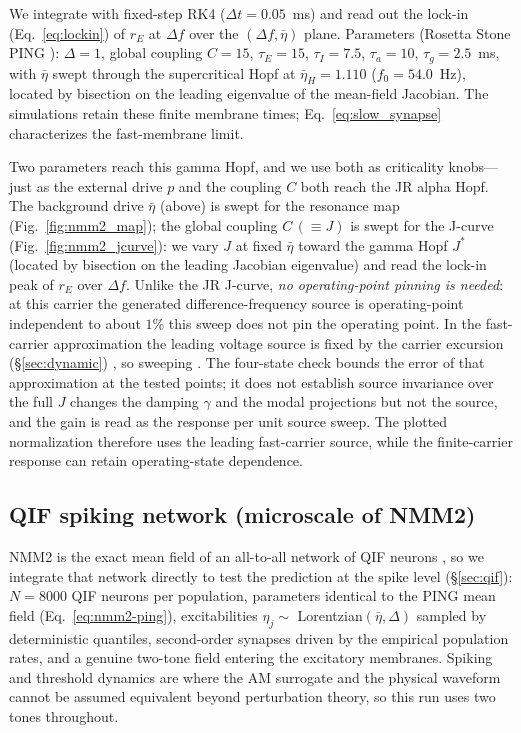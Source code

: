\documentclass[11pt,a4paper]{article}
\providecommand{\DIFaddtex}[1]{{\protect\color{blue} \sf #1}} %
\providecommand{\DIFdeltex}[1]{{\protect\color{red} \scriptsize #1}} %
\providecommand{\DIFaddbegin}{} %
\providecommand{\DIFaddend}{} %
\providecommand{\DIFdelbegin}{} %
\providecommand{\DIFdelend}{} %
\providecommand{\DIFadd}[1]{\texorpdfstring{\DIFaddtex{#1}}{#1}} %
\providecommand{\DIFdel}[1]{\texorpdfstring{\DIFdeltex{#1}}{}} %
\begin{document}
We integrate with fixed-step RK4 ($\Delta t=0.05$~ms) and read out the lock-in
(Eq.~\eqref{eq:lockin}) of $r_E$ at $\Delta f$ over the $(\Delta f, \bar\eta)$ plane.
Parameters (Rosetta Stone PING \cite{ruffini2025rosetta}): $\Delta=1$, global coupling
$C=15$, $\tau_E=15$, $\tau_I=7.5$, $\tau_a=10$, $\tau_g=2.5$~ms, with $\bar\eta$ swept
through the supercritical Hopf at $\bar\eta_H=1.110$ ($f_0=54.0$~Hz), located by bisection
on the leading eigenvalue of the mean-field Jacobian. The simulations retain these
finite membrane times; Eq.~\eqref{eq:slow_synapse} characterizes the fast-membrane limit.

Two parameters reach this gamma Hopf, and we use both as criticality knobs---just as the
external drive $p$ and the coupling $C$ both reach the JR alpha Hopf. The background drive
$\bar\eta$ (above) is swept for the resonance map (Fig.~\ref{fig:nmm2_map}); the global
coupling $C\,(\equiv J)$ is swept for the J-curve (Fig.~\ref{fig:nmm2_jcurve}): we vary
$J$ at fixed $\bar\eta$ toward the gamma Hopf $J^*$ (located by bisection on the leading
Jacobian eigenvalue) and read the lock-in peak of $r_E$ over $\Delta f$. Unlike the JR
J-curve, \DIFdelbegin \DIFdel{\emph{no operating-point pinning is needed}: at this carrier the generated
difference-frequency source is operating-point independent to about $1\%$
}\DIFdelend \DIFaddbegin \DIFadd{this sweep does not pin the operating point. In the fast-carrier
approximation the leading voltage source is fixed by the carrier excursion
}\DIFaddend (\S\ref{sec:dynamic})\DIFdelbegin \DIFdel{, so sweeping }\DIFdelend \DIFaddbegin \DIFadd{. The four-state check bounds the error of that approximation
at the tested points; it does not establish source invariance over the full }\DIFaddend $J$
\DIFdelbegin \DIFdel{changes the damping $\gamma$ and the modal
projections but not the source, and the gain is read as the response per unit source}\DIFdelend \DIFaddbegin \DIFadd{sweep. The plotted normalization therefore uses the leading fast-carrier source,
while the finite-carrier response can retain operating-state dependence}\DIFaddend .

\subsection{QIF spiking network (microscale of NMM2)}\label{sec:qif-methods}
NMM2 is the exact mean field of an all-to-all network of QIF neurons
\cite{montbrio2015,ruffini2025rosetta,clusella2023}, so we integrate that network directly
to test the prediction at the spike level (\S\ref{sec:qif}): $N=8000$ QIF neurons per
population, parameters identical to the PING mean field (Eq.~\eqref{eq:nmm2-ping}),
excitabilities $\eta_j\sim$ Lorentzian$(\bar\eta,\Delta)$ sampled by deterministic
quantiles, second-order synapses driven by the empirical population rates, and a genuine
two-tone field entering the excitatory membranes. Spiking and threshold dynamics are
where the AM surrogate and the physical waveform cannot be assumed equivalent beyond
perturbation theory, so this run uses two tones throughout.
\end{document}
